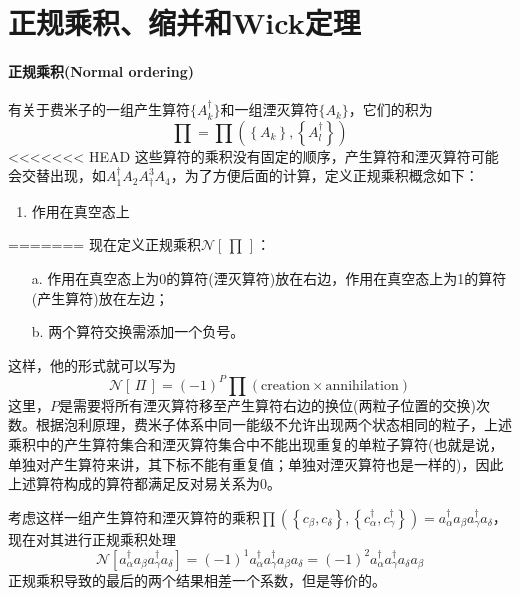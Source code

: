 \section{正规乘积、缩并和Wick定理}

\paragraph*{正规乘积(Normal ordering)}
有关于费米子的一组产生算符$\{A^{\dagger}_{k}\}$和一组湮灭算符$\{A_k\}$，它们的积为
\begin{equation}
    \prod = \prod \left(\left\{A_k\right\}, \left\{A^{\dagger}_l\right\}\right)
\end{equation}
<<<<<<< HEAD
这些算符的乘积没有固定的顺序，产生算符和湮灭算符可能会交替出现，如$A_1^\dagger A_2 A^3_\dagger A_4$，为了方便后面的计算，定义正规乘积概念如下：
\begin{enumerate}
    \item 作用在真空态上
\end{enumerate}
=======
现在定义正规乘积$\mathcal{N}[\,\prod\,]$：
\begin{enumerate}[topsep=1pt,itemsep=0pt]
	\item [a.] 作用在真空态上为0的算符(湮灭算符)放在右边，作用在真空态上为1的算符(产生算符)放在左边；
	\item [b.] 两个算符交换需添加一个负号。
\end{enumerate}
这样，他的形式就可以写为
\begin{equation}
    \mathcal{N}[\,\Pi \,] = (-1)^{P} \prod \left(\text{creation} \times \text{annihilation}\right)
\end{equation}
这里，$P$是需要将所有湮灭算符移至产生算符右边的换位(两粒子位置的交换)次数。根据泡利原理，费米子体系中同一能级不允许出现两个状态相同的粒子，上述乘积中的产生算符集合和湮灭算符集合中不能出现重复的单粒子算符(也就是说，单独对产生算符来讲，其下标不能有重复值；单独对湮灭算符也是一样的)，因此上述算符构成的算符都满足反对易关系为0。
\begin{example}
    考虑这样一组产生算符和湮灭算符的乘积$\prod(\left\{c_\beta, c_\delta\right\}, \left\{c_{\alpha}^{\dagger}, c_{\gamma}^{\dagger}\right\}) = a_{\alpha}^{\dagger} a_{\beta} a_{\gamma}^{\dagger} a_{\delta}$，现在对其进行正规乘积处理
    \begin{equation}
        \mathcal{N}\left[a_{\alpha}^{\dagger} a_{\beta} a_{\gamma}^{\dagger} a_{\delta}\right] = (-1)^{1} a_{\alpha}^{\dagger} a_{\gamma}^{\dagger} a_{\beta} a_{\delta} = (-1)^{2} a_{\alpha}^{\dagger} a_{\gamma}^{\dagger} a_{\delta} a_{\beta}
    \end{equation} 
    正规乘积导致的最后的两个结果相差一个系数，但是等价的。
\end{example}


